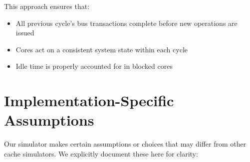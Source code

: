 \documentclass[11pt]{article}
\begin{document}
This approach ensures that:
\begin{itemize}
    \item All previous cycle's bus transactions complete before new operations are issued
    \item Cores act on a consistent system state within each cycle
    \item Idle time is properly accounted for in blocked cores
\end{itemize}

\section{Implementation-Specific Assumptions}

Our simulator makes certain assumptions or choices that may differ from other cache simulators. We explicitly document these here for clarity:
\end{document}
